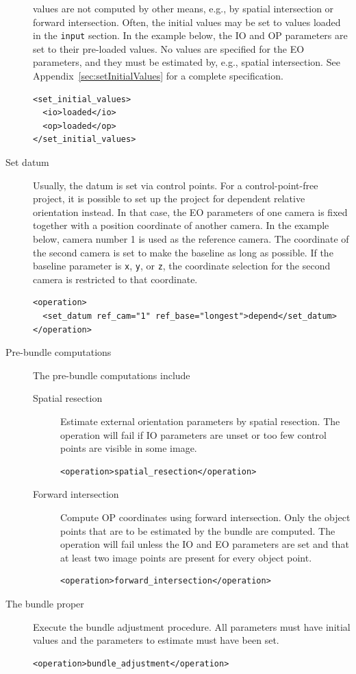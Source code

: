 \documentclass{article}
\begin{document}
\begin{description}
values are not computed by other means, e.g., by spatial
intersection or forward intersection. Often, the initial values
may be set to values loaded in the \texttt{input} section. In the
example below, the IO and OP parameters are set to their
pre-loaded values. No values are specified for the EO parameters,
and they must be estimated by, e.g., spatial intersection. See
Appendix~\ref{sec:setInitialValues} for a complete specification.
\begin{verbatim}
<set_initial_values>
  <io>loaded</io>
  <op>loaded</op>
</set_initial_values>
\end{verbatim}
\item[{Set datum}] Usually, the datum is set via control points. For a
control-point-free project, it is possible to set up
the project for dependent relative orientation instead.
In that case, the EO parameters of one camera is fixed
together with a position coordinate of another camera.
In the example below, camera number 1 is used as the
reference camera. The coordinate of the second camera
is set to make the baseline as long as possible. If the
baseline parameter is \texttt{x}, \texttt{y}, or \texttt{z}, the coordinate
selection for the second camera is restricted to that
coordinate.
\begin{verbatim}
<operation>
  <set_datum ref_cam="1" ref_base="longest">depend</set_datum>
</operation>
\end{verbatim}
\item[{Pre-bundle computations}] The pre-bundle computations include
\begin{description}
\item[{Spatial resection}] Estimate external orientation parameters by
spatial resection. The operation will fail if IO parameters are
unset or too few control points are visible in some image.
\begin{verbatim}
<operation>spatial_resection</operation>
\end{verbatim}
\item[{Forward intersection}] Compute OP coordinates using forward
intersection. Only the object points that are to be estimated
by the bundle are computed. The operation will fail unless the
IO and EO parameters are set and that at least two image points
are present for every object point.
\begin{verbatim}
<operation>forward_intersection</operation>
\end{verbatim}
\end{description}
\item[{The bundle proper}] Execute the bundle adjustment procedure. All
parameters must have initial values and the parameters to
estimate must have been set.
\begin{verbatim}
<operation>bundle_adjustment</operation>
\end{verbatim}
\end{description}
\end{document}
